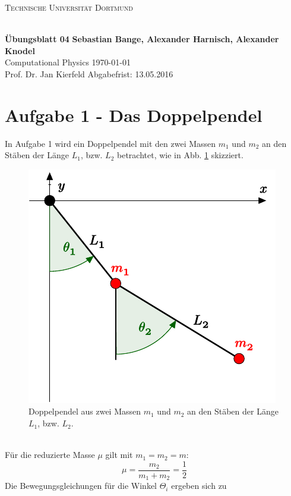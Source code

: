 
\newcommand\OverfullCenter[1]{\noindent\makebox[\linewidth]{#1}}

\noindent
\centerline{\small{\textsc{Technische Universität Dortmund}}} \\
\large\textbf{Übungsblatt 04} \hfill \footnotesize\textbf{Sebastian Bange, Alexander Harnisch, Alexander Knodel} \\
\normalsize Computational Physics \hfill \today \\
Prof. Dr. Jan Kierfeld \hfill Abgabefrist: 13.05.2016\\
\noindent\makebox[\linewidth]{\rule{\textwidth}{0.4pt}}
\section*{Aufgabe 1 - Das Doppelpendel}
In Aufgabe 1 wird ein Doppelpendel mit den zwei Massen $m_1$ und $m_2$ an den Stäben der Länge $L_1$, bzw. $L_2$ betrachtet, wie in Abb. \ref{fig:pendel} skizziert.
\begin{figure}
	\includegraphics{./blatt.pdf}
	\caption{Doppelpendel aus zwei Massen $m_1$ und $m_2$ an den Stäben der Länge $L_1$, bzw. $L_2$.}
	\label{fig:pendel}
\end{figure}
\\Für die reduzierte Masse $\mu$ gilt mit $m_1 = m_2 = m$:
\begin{equation}
\mu = \frac{m_2}{m_1 + m_2} = \frac{1}{2}
\label{eq:redMasse}
\end{equation}
Die Bewegungsgleichungen für die Winkel $\Theta_i$ ergeben sich zu
